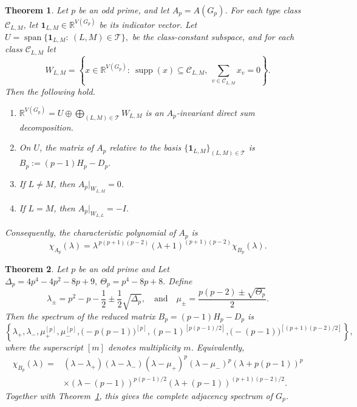 \documentclass[10pt,a4paper]{amsart}
\newtheorem{theorem}{Theorem}
\newcommand{\calC}{\mathcal{C}}
\newcommand{\calT}{\mathcal{T}}
\newcommand{\one}{\mathbf{1}}
\begin{document}
	\begin{theorem}\label{thm:charfactor}
		Let $p$ be an odd prime, and let $A_p=A(G_p)$. For each type class $\calC_{L,M}$, let
		$\one_{L,M}\in \mathbb{R}^{V(G_p)}$ be its indicator vector. Let $U=\operatorname{span}\{\one_{L,M}:\ (L,M)\in \calT\},$ be the class-constant subspace, and for each class $\calC_{L,M}$ let
		$$
		W_{L,M}=\left\{x\in \mathbb{R}^{V(G_p)}:\ \operatorname{supp}(x)\subseteq \calC_{L,M},\ \sum_{v\in \calC_{L,M}}x_v=0\right\}.
		$$
		Then the following hold.
		\begin{enumerate}[label=\textup{(\roman*)},noitemsep]
			\item $\mathbb{R}^{V(G_p)}=U\oplus\bigoplus_{(L,M)\in\calT}W_{L,M}$ is an $A_p$-invariant direct sum decomposition.
			\item On $U$, the matrix of $A_p$ relative to the basis $\{\one_{L,M}\}_{(L,M)\in\calT}$ is $B_p:=(p-1)H_p-D_p.$ 
			\item If $L\neq M$, then $A_p|_{W_{L,M}}=0$.
			\item If $L=M$, then $A_p|_{W_{L,L}}=-I$.
		\end{enumerate}
		Consequently, the characteristic polynomial of $A_p$ is
		$$
		\chi_{A_p}(\lambda)
		=
		\lambda^{\,p(p+1)(p-2)}(\lambda+1)^{(p+1)(p-2)}\chi_{B_p}(\lambda).
		$$
	\end{theorem}

	\begin{theorem}\label{thm:fullreducedspectrum}
		Let $p$ be an odd prime and Let
		$
		\Delta_p=4p^4-4p^2-8p+9,~
		\Theta_p=p^4-8p+8.
		$
		Define
		$$
		\lambda_{\pm}=p^2-p-\frac12\pm\frac12\sqrt{\Delta_p},
		\quad
		\text{and}
		\quad
		\mu_{\pm}=\frac{p(p-2)\pm\sqrt{\Theta_p}}{2}.
		$$
		Then the spectrum of the reduced matrix $B_p=(p-1)H_p-D_p$ is
		$$
		\left\{
		\lambda_+,\lambda_-,
		\mu_+^{[p]},\mu_-^{[p]},
		\bigl(-p(p-1)\bigr)^{[p]},
		(p-1)^{[p(p-1)/2]},
		\bigl(-(p-1)\bigr)^{[(p+1)(p-2)/2]}
		\right\},
		$$
		where the superscript $[m]$ denotes multiplicity $m$. Equivalently,
		$$
		\begin{aligned}
			\chi_{B_p}(\lambda)
			={}&(\lambda-\lambda_+)(\lambda-\lambda_-)
			(\lambda-\mu_+)^p(\lambda-\mu_-)^p
			(\lambda+p(p-1))^p\\
			&\times(\lambda-(p-1))^{p(p-1)/2}
			(\lambda+(p-1))^{(p+1)(p-2)/2}.
		\end{aligned}
		$$
		Together with Theorem~\ref{thm:charfactor}, this gives the complete adjacency spectrum of $G_p$.
	\end{theorem}
\end{document}
